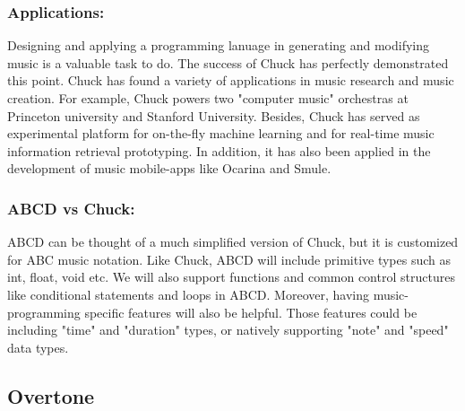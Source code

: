     \subsubsection{Applications:}
    Designing and applying a programming lanuage in generating and modifying music is a valuable task to do. The success of Chuck has perfectly demonstrated this point. Chuck has found a variety of applications in music research and music creation. For example, Chuck powers two "computer music" orchestras at Princeton university and Stanford University. Besides, Chuck has served as experimental platform for on-the-fly machine learning and for real-time music information retrieval prototyping\cite{Wang15}. In addition, it has also been applied in the development of music mobile-apps like Ocarina and Smule\cite{Wang15}. 

    \subsubsection{ABCD vs Chuck:}
    ABCD can be thought of a much simplified version of Chuck, but it is customized for ABC music notation. Like Chuck, ABCD will include primitive types such as int, float, void etc. We will also support functions and common control structures like conditional statements and loops in ABCD. Moreover, having music-programming specific features will also be helpful. Those features could be including "time" and "duration" types, or natively supporting "note" and "speed" data types.
     

\subsection{Overtone}

